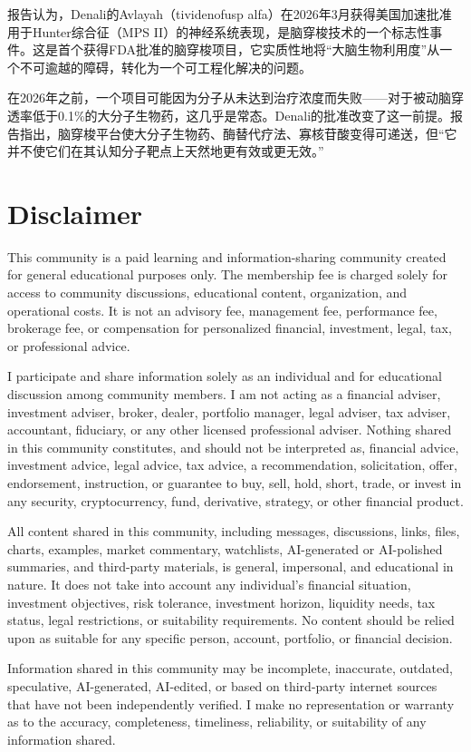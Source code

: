 \documentclass[11pt]{ctexart}
\begin{document}
报告认为，Denali的Avlayah（tividenofusp alfa）在2026年3月获得美国加速批准用于Hunter综合征（MPS II）的神经系统表现，是脑穿梭技术的一个标志性事件。这是首个获得FDA批准的脑穿梭项目，它实质性地将“大脑生物利用度”从一个不可逾越的障碍，转化为一个可工程化解决的问题。

在2026年之前，一个项目可能因为分子从未达到治疗浓度而失败——对于被动脑穿透率低于0.1\%的大分子生物药，这几乎是常态。Denali的批准改变了这一前提。报告指出，脑穿梭平台使大分子生物药、酶替代疗法、寡核苷酸变得可递送，但“它并不使它们在其认知分子靶点上天然地更有效或更无效。”

\section{Disclaimer}
{\scriptsize\color{refgray}
This community is a paid learning and information-sharing community created for general educational purposes only. The membership fee is charged solely for access to community discussions, educational content, organization, and operational costs. It is not an advisory fee, management fee, performance fee, brokerage fee, or compensation for personalized financial, investment, legal, tax, or professional advice.\par
I participate and share information solely as an individual and for educational discussion among community members. I am not acting as a financial adviser, investment adviser, broker, dealer, portfolio manager, legal adviser, tax adviser, accountant, fiduciary, or any other licensed professional adviser. Nothing shared in this community constitutes, and should not be interpreted as, financial advice, investment advice, legal advice, tax advice, a recommendation, solicitation, offer, endorsement, instruction, or guarantee to buy, sell, hold, short, trade, or invest in any security, cryptocurrency, fund, derivative, strategy, or other financial product.\par
All content shared in this community, including messages, discussions, links, files, charts, examples, market commentary, watchlists, AI-generated or AI-polished summaries, and third-party materials, is general, impersonal, and educational in nature. It does not take into account any individual's financial situation, investment objectives, risk tolerance, investment horizon, liquidity needs, tax status, legal restrictions, or suitability requirements. No content should be relied upon as suitable for any specific person, account, portfolio, or financial decision.\par
Information shared in this community may be incomplete, inaccurate, outdated, speculative, AI-generated, AI-edited, or based on third-party internet sources that have not been independently verified. I make no representation or warranty as to the accuracy, completeness, timeliness, reliability, or suitability of any information shared.\par
}
\end{document}
